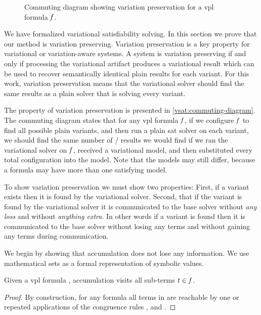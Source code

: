 \label{section:vsat:variation-preservation}
%
\begin{figure}[h]
  \centering
  
  \caption{Commuting diagram showing variation preservation for a \ac{vpl}
    formula $\mathit{f}$.}%
  \label{vsat:commuting-diagram}
\end{figure}
%
We have formalized variational satisfiability solving. In this section we prove
that our method is variation preserving. Variation preservation is a key
property for variational or variation-aware systems. A system is variation
preserving if and only if processing the variational artifact produces a
variational result which can be used to recover semantically identical plain
results for each variant. For this work, variation preservation means that the
variational solver should find the same results as a plain solver that is
solving every variant.

The property of variation preservation is presented in
\autoref{vsat:commuting-diagram}. The commuting diagram states that for any
\ac{vpl} formula $\mathit{f}$, if we configure $\mathit{f}$ to find all possible plain
variants, and then run a plain \ac{sat} solver on each variant, we should find
the same number of / results we would find if we ran the
variational solver on $\mathit{f}$, received a variational model, and then
substituted every total configuration into the model. Note that the models may
still differ, because a formula may have more than one satisfying model.

To show variation preservation we must show two properties: First, if a variant
exists then it is found by the variational solver. Second, that if the variant
is found by the variational solver it is communicated to the base solver without
\emph{any loss} and without \emph{anything extra}. In other words if a variant
is found then it is communicated to the base solver without losing any terms and
without gaining any terms during communication.

We begin by showing that accumulation does not lose any information. We use
mathematical sets as a formal representation of symbolic values.

\begin{lemma}
  \label{lemma:acc:all-terms}
  Given a \ac{vpl} formula \fV{}, accumulation visits all sub-terms $\mathit{t}{} \in
  \mathit{f}{}$.
\end{lemma}
%
\begin{proof}
  By construction, for any formula \fV{} all terms in \tV{} are reachable by one
  or repeated applications of the congruence rules \acOrV{}, \acAndV{} and
  \acNotV{}.
\end{proof}

